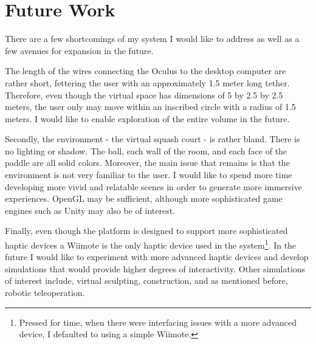 \section{Future Work}
\label{sec:future}

There are a few shortcomings of my system I would like to address as well 
as a few avenues for expansion in the future. 

The length of the wires connecting the Oculus to the desktop computer are
rather short, fettering the user with an approximately 1.5 meter long tether.
Therefore, even though the virtual space has dimensions of 5 by 2.5 by 2.5
meters, the user only may move within an inscribed circle with a radius of 1.5
meters.  I would like to enable exploration of the entire volume in the future. 

Secondly, the environment - the virtual squash court - is rather bland. There
is no lighting or shadow. The ball, each wall of the room, and each face of the
paddle are all solid colors. Moreover, the main issue that remains is that the
environment is not very familiar to the user. I would like to spend more time
developing more vivid and relatable scenes in order to generate more immersive
experiences. OpenGL may be sufficient, although more sophisticated game engines
such as Unity \cite{website:unity} may also be of interest.

Finally, even though the platform is designed to support more sophisticated
haptic devices a Wiimote is the only haptic device used in the
system\footnote{Pressed for time, when there were interfacing issues with a
more advanced device, I defaulted to using a simple Wiimote.}. In the future I
would like to experiment with more advanced haptic devices and develop
simulations that would provide higher degrees of interactivity. Other
simulations of interest include, virtual sculpting, construction, and as
mentioned before, robotic teleoperation.
